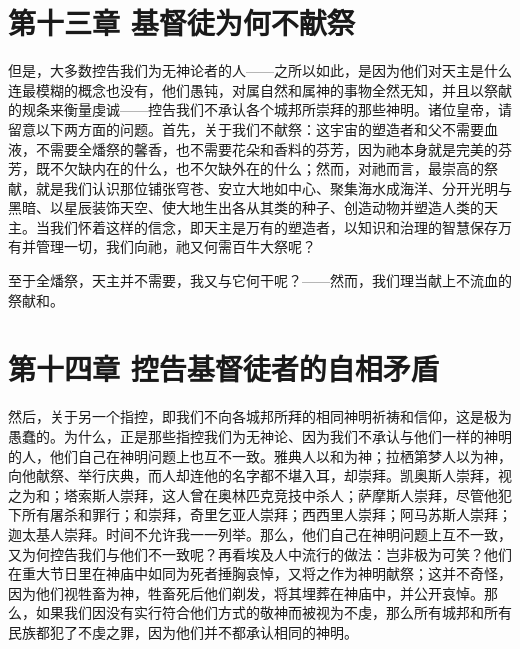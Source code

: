 
\section{第十三章 基督徒为何不献祭}

但是，大多数控告我们为无神论者的人——之所以如此，是因为他们对天主是什么连最模糊的概念也没有，他们愚钝，对属自然和属神的事物全然无知，并且以祭献的规条来衡量虔诚——控告我们不承认各个城邦所崇拜的那些神明。诸位皇帝，请留意以下两方面的问题。首先，关于我们不献祭：这宇宙的塑造者和父不需要血液，不需要全燔祭的馨香，也不需要花朵和香料的芬芳，因为祂本身就是完美的芬芳，既不欠缺内在的什么，也不欠缺外在的什么；然而，对祂而言，最崇高的祭献，就是我们认识那位铺张穹苍、安立大地如中心、聚集海水成海洋、分开光明与黑暗、以星辰装饰天空、使大地生出各从其类的种子、创造动物并塑造人类的天主。当我们怀着这样的信念，即天主是万有的塑造者，以知识和治理的智慧保存万有并管理一切，我们向祂，祂又何需百牛大祭呢？\par

\par

至于全燔祭，天主并不需要，我又与它何干呢？——然而，我们理当献上不流血的祭献和。\par


\section{第十四章 控告基督徒者的自相矛盾}

然后，关于另一个指控，即我们不向各城邦所拜的相同神明祈祷和信仰，这是极为愚蠢的。为什么，正是那些指控我们为无神论、因为我们不承认与他们一样的神明的人，他们自己在神明问题上也互不一致。雅典人以和为神；拉栖第梦人以为神，向他献祭、举行庆典，而人却连他的名字都不堪入耳，却崇拜。凯奥斯人崇拜，视之为和；塔索斯人崇拜，这人曾在奥林匹克竞技中杀人；萨摩斯人崇拜，尽管他犯下所有屠杀和罪行；和崇拜，奇里乞亚人崇拜；西西里人崇拜；阿马苏斯人崇拜；迦太基人崇拜。时间不允许我一一列举。那么，他们自己在神明问题上互不一致，又为何控告我们与他们不一致呢？再看埃及人中流行的做法：岂非极为可笑？他们在重大节日里在神庙中如同为死者捶胸哀悼，又将之作为神明献祭；这并不奇怪，因为他们视牲畜为神，牲畜死后他们剃发，将其埋葬在神庙中，并公开哀悼。那么，如果我们因没有实行符合他们方式的敬神而被视为不虔，那么所有城邦和所有民族都犯了不虔之罪，因为他们并不都承认相同的神明。\par

